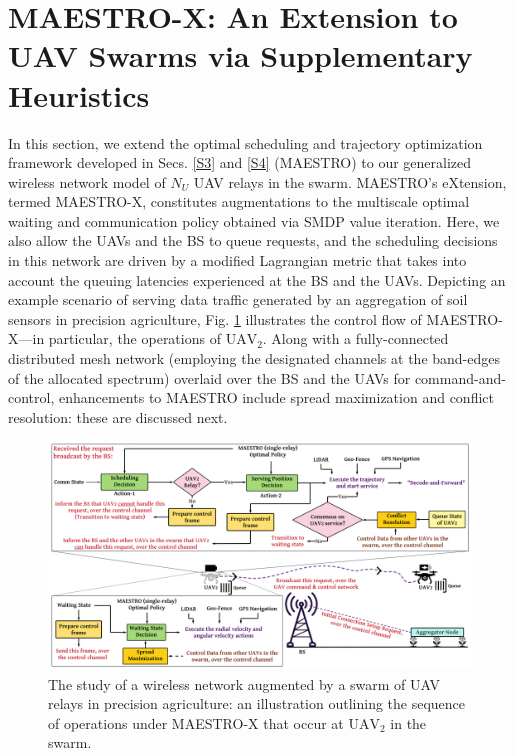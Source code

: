 \documentclass[12pt, draftcls, onecolumn]{IEEEtran}
\theoremstyle{plain}
\theoremstyle{definition}
\theoremstyle{remark}
\newcommand{\nm}[1]{\textcolor{magenta}{[NM: #1]}}
\begin{document}
\section{MAESTRO-X: An Extension to UAV Swarms via Supplementary Heuristics}\label{S5}
\vspace{-2mm}

In this section, we  extend the optimal scheduling and trajectory optimization framework developed in Secs. \ref{S3} and \ref{S4} (MAESTRO) to our generalized wireless network model of $N_{U}$ UAV relays in the swarm. MAESTRO's eXtension, termed MAESTRO-X, constitutes augmentations to the multiscale optimal {waiting} and {communication} policy obtained via SMDP value iteration. Here, we also allow the UAVs and the BS to queue requests, and the scheduling decisions in this network are driven by a modified Lagrangian metric that takes into account the queuing latencies experienced at the BS and the UAVs. Depicting an example scenario of serving data traffic generated by an aggregation of soil sensors in precision agriculture, Fig. \ref{F5} illustrates the control flow of MAESTRO-X---in particular, the operations of $\mathrm{UAV}_{2}$. Along with a fully-connected distributed mesh network (employing the designated channels at the band-edges of the allocated spectrum) overlaid over the BS and the UAVs for command-and-control, enhancements to MAESTRO include spread maximization and conflict resolution: these are discussed next.

\begin{figure} [t]
    \centering
    \includegraphics[width=0.9\linewidth]{figs/Sequence_of_Operations.png}
    \vspace{-2mm}
    \caption{The study of a wireless network augmented by a swarm of UAV relays in precision agriculture: an illustration outlining the sequence of operations under MAESTRO-X that occur at $\text{UAV}_{2}$ in the swarm.}
    \label{F5}
\end{figure}
\end{document}

